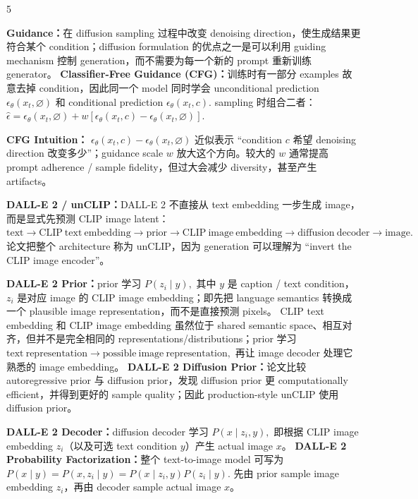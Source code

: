 \documentclass[a4paper, landscape]{article}
\begin{document}
\begin{multicols}{5}
\par \textbf{Guidance：}在 diffusion sampling 过程中改变 denoising direction，使生成结果更符合某个 condition；diffusion formulation 的优点之一是可以利用 guiding mechanism 控制 generation，而不需要为每一个新的 prompt 重新训练 generator。
\textbf{Classifier-Free Guidance (CFG)：}训练时有一部分 examples 故意去掉 condition，因此同一个 model 同时学会 unconditional prediction
\(
\epsilon_\theta(x_t,\varnothing)
\)
和 conditional prediction
\(
\epsilon_\theta(x_t,c).
\)
sampling 时组合二者：
\(
\hat\epsilon
=
\epsilon_\theta(x_t,\varnothing)
+
w\left[
\epsilon_\theta(x_t,c)
-
\epsilon_\theta(x_t,\varnothing)
\right].
\)

\par \textbf{CFG Intuition：}
\(
\epsilon_\theta(x_t,c)-\epsilon_\theta(x_t,\varnothing)
\)
近似表示 ``condition \(c\) 希望 denoising direction 改变多少''；guidance scale \(w\) 放大这个方向。较大的 \(w\) 通常提高 prompt adherence / sample fidelity，但过大会减少 diversity，甚至产生 artifacts。

\par \textbf{DALL-E 2 / unCLIP：}DALL-E 2 不直接从 text embedding 一步生成 image，而是显式先预测 CLIP image latent：
\(
\mathrm{text}
\rightarrow
\mathrm{CLIP\ text\ embedding}
\rightarrow
\mathrm{prior}
\rightarrow
\mathrm{CLIP\ image\ embedding}
\rightarrow
\mathrm{diffusion\ decoder}
\rightarrow
\mathrm{image}.
\)
论文把整个 architecture 称为 unCLIP，因为 generation 可以理解为 ``invert the CLIP image encoder''。

\par \textbf{DALL-E 2 Prior：}prior 学习
\(
P(z_i\mid y),
\)
其中 \(y\) 是 caption / text condition，\(z_i\) 是对应 image 的 CLIP image embedding；即先把 language semantics 转换成一个 plausible image representation，而不是直接预测 pixels。
CLIP text embedding 和 CLIP image embedding 虽然位于 shared semantic space、相互对齐，但并不是完全相同的 representations/distributions；prior 学习
\(
\mathrm{text\ representation}\rightarrow
\mathrm{possible\ image\ representation},
\)
再让 image decoder 处理它熟悉的 image embedding。
\textbf{DALL-E 2 Diffusion Prior：}论文比较 autoregressive prior 与 diffusion prior，发现 diffusion prior 更 computationally efficient，并得到更好的 sample quality；因此 production-style unCLIP 使用 diffusion prior。

\par \textbf{DALL-E 2 Decoder：}diffusion decoder 学习
\(
P(x\mid z_i,y),
\)
即根据 CLIP image embedding \(z_i\)（以及可选 text condition \(y\)）产生 actual image \(x\)。
\textbf{DALL-E 2 Probability Factorization：}整个 text-to-image model 可写为
\(
P(x\mid y)
=
P(x,z_i\mid y)
=
P(x\mid z_i,y)P(z_i\mid y).
\)
先由 prior sample image embedding \(z_i\)，再由 decoder sample actual image \(x\)。


\end{multicols}
\end{document}
